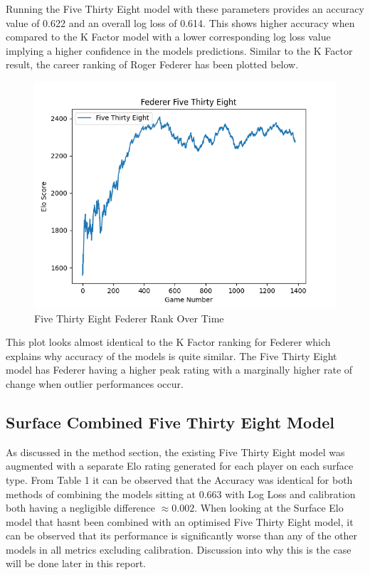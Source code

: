\documentclass[12pt,a4paper]{article}
\begin{document}
Running the Five Thirty Eight model with these parameters provides an accuracy value of
0.622 and an overall log loss of 0.614. This shows higher accuracy when compared
to the K Factor model
with a lower corresponding log loss value implying a higher confidence in the models predictions.
Similar to the K Factor result, the career ranking of Roger Federer has been plotted below.

\begin{figure}[H]
  \centering
  \includegraphics[scale=0.8]{images/federer_538.png}
  \caption{Five Thirty Eight Federer Rank Over Time}
  \label{fig:federer-538}
\end{figure}

This plot looks almost identical to the K Factor ranking for Federer which explains why
accuracy of the models is quite similar. The Five Thirty Eight model has Federer having a
higher peak rating with a marginally higher rate of change when outlier performances occur.

\subsection{Surface Combined Five Thirty Eight Model}
As discussed in the method section, the existing Five Thirty Eight model was augmented
with a separate Elo rating generated for each player on each surface type. From Table 1
it can be observed that the Accuracy was identical for both methods of combining the models
sitting at $0.663$ with Log Loss and calibration both having a negligible difference
$\approx 0.002$. When looking at the Surface Elo model that hasnt been combined with an
optimised Five Thirty Eight model, it can be observed that its performance is significantly
worse than any of the other models in all metrics excluding calibration. Discussion into why
this is the case will be done later in this report.
\end{document}

